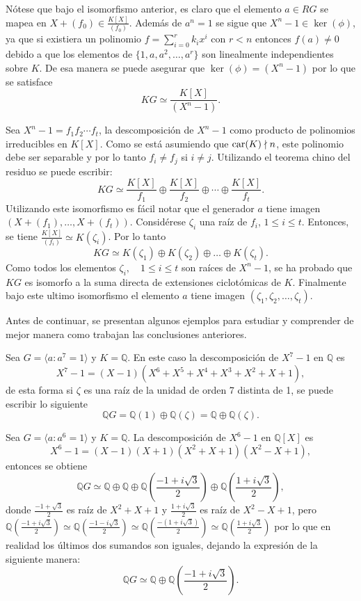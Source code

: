 Nótese que bajo el isomorfismo anterior, es claro que el elemento $a \in RG$ se mapea en $X + (f_0) \in \frac{K[X]}{(f_0)}$. Además de $a^n = 1$ se sigue que $X^n -1 \in \ker(\phi)$, ya que si existiera un polinomio $f = \sum_{i=0}^{r}k_ix^i$ con $r < n$ entonces $f(a) \neq 0$ debido a que los elementos de $\{1,a,a^2, \dots, a^r \}$ son linealmente independientes sobre $K$. De esa manera se puede asegurar que $\ker(\phi) = (X^n -1)$ por lo que se satisface 
\[KG \simeq \frac{K[X]}{(X^n -1 )}. \]

Sea $ X^n -1 = f_1f_2\cdots f_t$, la descomposición de $X^n -1$ como producto de polinomios irreducibles en $K[X]$. Como se está asumiendo que $\operatorname{car}(K) \nmid n$, este polinomio debe ser separable y por lo tanto $f_i \neq f_j$ si $i \neq j$. Utilizando el teorema chino del residuo se puede escribir:
\[KG \simeq \frac{K[X]}{f_1} \oplus \frac{K[X]}{f_2} \oplus \cdots \oplus \frac{K[X]}{f_t}. \]
Utilizando este isomorfismo es fácil notar que el generador $a$ tiene imagen $( X + (f_1)  , \dots, X + (f_t) ) $. 
Considérese $\zeta_i$ una raíz de $f_i$, $1 \leq i \leq t$. Entonces, se tiene $\frac{K[X]}{(f_i)} \simeq K(\zeta_i)$. Por lo tanto
\[ KG \simeq K(\zeta_1) \oplus K(\zeta_2) \oplus \dots \oplus K(\zeta_t). \]
Como todos los elementos $\zeta_i , \quad 1 \leq i \leq t$ son raíces de $X^n -1$, se ha probado que $KG$ es isomorfo a la suma directa de extensiones ciclotómicas de $K$. Finalmente bajo este 
ultimo isomorfismo el elemento $a$ tiene imagen $(\zeta_1 , \zeta_2, \dots ,\zeta_t)$.

Antes de continuar, se presentan algunos ejemplos para estudiar y comprender de mejor manera como trabajan las conclusiones anteriores.
\begin{ejemplo}\label{ejem:orden7}
Sea $G = \langle a \colon a^7 = 1 \rangle$ y $K = \mathds{Q} $. 
En este caso la descomposición de $ X^7 -1$ en $\mathds{Q}$ es 
\[ X^7 -1 = (X-1)(X^6 + X^5 + X^4 + X^3 + X^2 + X + 1), \]
de esta forma si $\zeta$ es una raíz de la unidad de orden 7 distinta de 1, se puede escribir lo siguiente
\[  \mathds{Q}G = \mathds{Q}(1) \oplus \mathds{Q}(\zeta) = \mathds{Q} \oplus \mathds{Q}(\zeta).   \]
\end{ejemplo}
\begin{ejemplo}
Sea $G = \langle a: a^6 = 1 \rangle$ y $K = \mathds{Q}$. La descomposición de $X^6 - 1 $ en $\mathds{Q}[X]$ es 
\[ X^6 - 1 = (X-1)(X+1)(X^2 + X + 1)(X^2-X+1), \]
entonces se obtiene 
\[  \mathds{Q}G \simeq \mathds{Q} \oplus \mathds{Q} \oplus \mathds{Q}\left( \frac{-1+i\sqrt{3}}{2} \right) \oplus \mathds{Q}\left( \frac{1+i\sqrt{3}}{2} \right),\]
donde $\frac{-1 + \sqrt{3}}{2}$ es raíz de $X^2+X+1$ y $\frac{1+i\sqrt{3}}{2}$ es raíz de $X^2-X+1$, pero $\mathds{Q}\left( \frac{-1+i\sqrt{3}}{2} \right) \simeq \mathds{Q}\left( \frac{-1-i\sqrt{3}}{2} \right) \simeq \mathds{Q}\left( \frac{-(1+i\sqrt{3})}{2} \right) \simeq \mathds{Q}\left( \frac{1+i\sqrt{3}}{2} \right)$
por lo que en realidad los últimos dos sumandos son iguales, dejando la expresión de la siguiente manera:
\[  \mathds{Q}G \simeq  \mathds{Q} \oplus \mathds{Q}\left( \frac{-1+i\sqrt{3}}{2} \right).   \]
\end{ejemplo}

